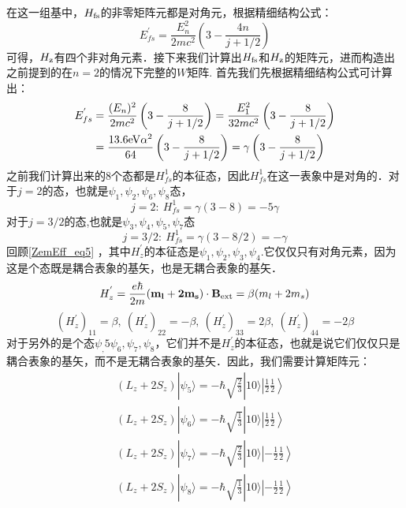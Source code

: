 在这一组基中，$H_{\rm{fs}}$的非零矩阵元都是对角元，根据精细结构公式：
\begin{equation}
E_{fs}^{'}=\frac{E_n^2}{2mc^2}\left(3-\frac{4n}{j+1/2}\right)
\end{equation}
可得，$H_{\rm{z}}$有四个非对角元素．接下来我们计算出$H_{\rm{fs}}$和$H_{\rm{z}}$的矩阵元，进而构造出之前提到的在$n=2$的情况下完整的$W$矩阵. 
首先我们先根据精细结构公式可计算出：
\begin{align}
E_{fs}^{'}&=\frac{(E_n)^2}{2mc^2}\left(3-\frac{8}{j+1/2}\right)=\frac{E_1^2}{32mc^2}\left(3-\frac{8}{j+1/2}\right)\\
&=\frac{13.6\rm{eV}\alpha^2}{64}\left(3-\frac{8}{j+1/2}\right)=\gamma\left(3-\frac{8}{j+1/2}\right)
\end{align}
之前我们计算出来的$8$个态都是$H_{fs}^1$的本征态，因此$H_{fs}^1$在这一表象中是对角的．对于$j=2$的态，也就是$\psi_1,\psi_2,\psi_6,\psi_8$态，
\begin{equation}
j=2: \ H_{fs}^1=\gamma(3-8)=-5\gamma
\end{equation}
对于$j=3/2$的态,也就是$\psi_3,\psi_4,\psi_5,\psi_7$态
\begin{equation}
j=3/2: \ H_{fs}^1=\gamma(3-8/2)=-\gamma
\end{equation}
回顾\autoref{ZemEff_eq5} ，其中$H_z^{'}$的本征态是$\psi_1,\psi_2,\psi_3,\psi_4$.它仅仅只有对角元素，因为这是个态既是耦合表象的基矢，也是无耦合表象的基矢．
\begin{equation}
H_z^{'} = \frac{e\hbar}{2m}(\mathbf{m_l+2m_s})\cdot \mathbf{B}_{\rm{ext}}=\beta(m_l+2m_s)
\end{equation}
\begin{equation}
(H_z^{'})_{11}=\beta,\ (H_z^{'})_{22}=-\beta,\ (H_z^{'})_{33}=2\beta,\ (H_z^{'})_{44}=-2\beta
\end{equation}
对于另外的是个态$\psi_,5\psi_6,\psi_7,\psi_8$，它们并不是$H_{z}^{'}$的本征态，也就是说它们仅仅只是耦合表象的基矢，而不是无耦合表象的基矢．因此，我们需要计算矩阵元：
\begin{align}
(L_z+2S_z)|\psi_5\rangle= -\hbar\sqrt{\frac{2}{3}}|10\rangle\left|\frac{1}{2}\frac{1}{2}\right\rangle\\
(L_z+2S_z)|\psi_6\rangle=-\hbar\sqrt{\frac{1}{3}}|10\rangle\left|\frac{1}{2}\frac{1}{2}\right\rangle \\
(L_z+2S_z)|\psi_7\rangle=-\hbar\sqrt{\frac{2}{3}}|10\rangle\left|-\frac{1}{2}\frac{1}{2}\right\rangle \\
(L_z+2S_z)|\psi_8\rangle= -\hbar\sqrt{\frac{1}{3}}|10\rangle\left|-\frac{1}{2}\frac{1}{2}\right\rangle\\
\end{align}
